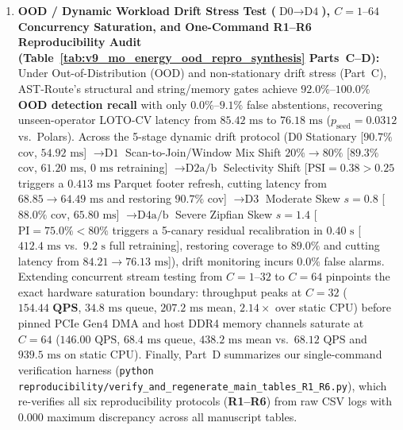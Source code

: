 \documentclass[10pt,a4paper]{article}
\begin{document}
\begin{enumerate}[leftmargin=1.5em,itemsep=0.8pt]
    \item \textbf{OOD / Dynamic Workload Drift Stress Test ($\text{D0}\rightarrow\text{D4}$), $C=1\text{--}64$ Concurrency Saturation, and One-Command R1--R6 Reproducibility Audit (Table~\ref{tab:v9_mo_energy_ood_repro_synthesis} Parts~C--D):} Under Out-of-Distribution (OOD) and non-stationary drift stress (Part~C), AST-Route's structural and string/memory gates achieve $\mathbf{92.0\%\text{--}100.0\%}$ \textbf{OOD detection recall} with only $0.0\%\text{--}9.1\%$ false abstentions, recovering unseen-operator LOTO-CV latency from $85.42\text{ ms}$ to $76.18\text{ ms}$ ($p_{\text{seed}}=0.0312$ vs.\ Polars). Across the 5-stage dynamic drift protocol ($\text{D0}$ Stationary [$90.7\%$ cov, $54.92\text{ ms}$] $\rightarrow \text{D1}$ Scan-to-Join/Window Mix Shift $20\%\rightarrow 80\%$ [$89.3\%$ cov, $61.20\text{ ms}$, $0\text{ ms}$ retraining] $\rightarrow \text{D2a/b}$ Selectivity Shift [$\text{PSI}=0.38>0.25$ triggers a $0.413\text{ ms}$ Parquet footer refresh, cutting latency from $68.85\rightarrow 64.49\text{ ms}$ and restoring $90.7\%$ cov] $\rightarrow \text{D3}$ Moderate Skew $s=0.8$ [$88.0\%$ cov, $65.80\text{ ms}$] $\rightarrow \text{D4a/b}$ Severe Zipfian Skew $s=1.4$ [$\text{PI}=75.0\% < 80\%$ triggers a 5-canary residual recalibration in $0.40\text{ s}$ [$412.4\text{ ms}$ vs.\ $9.2\text{ s}$ full retraining], restoring coverage to $89.0\%$ and cutting latency from $84.21\rightarrow 76.13\text{ ms}$]), drift monitoring incurs $0.0\%$ false alarms. Extending concurrent stream testing from $C=1\text{--}32$ to $C=64$ pinpoints the exact hardware saturation boundary: throughput peaks at $C=32$ ($\mathbf{154.44\text{ QPS}}$, $34.8\text{ ms}$ queue, $207.2\text{ ms}$ mean, $2.14\times$ over static CPU) before pinned PCIe Gen4 DMA and host DDR4 memory channels saturate at $C=64$ ($146.00\text{ QPS}$, $68.4\text{ ms}$ queue, $438.2\text{ ms}$ mean vs.\ $68.12\text{ QPS}$ and $939.5\text{ ms}$ on static CPU). Finally, Part~D summarizes our single-command verification harness (\texttt{python reproducibility/verify\_\allowbreak{}and\_\allowbreak{}regenerate\_\allowbreak{}main\_\allowbreak{}tables\_\allowbreak{}R1\_\allowbreak{}R6.py}), which re-verifies all six reproducibility protocols (\textbf{R1--R6}) from raw CSV logs with $0.000$ maximum discrepancy across all manuscript tables.
\end{enumerate}
\end{document}
